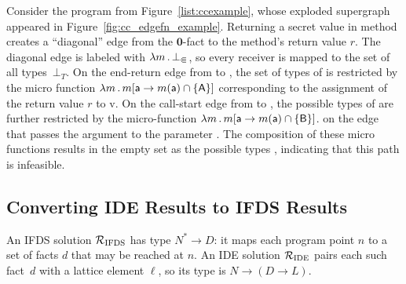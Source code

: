 \begin{example}
  Consider the program from Figure~\ref{list:ccexample}, whose exploded supergraph appeared in Figure~\ref{fig:cc_edgefn_example}.
%
  Returning a secret value in method  creates a ``diagonal'' edge from the $\mathbf0$-fact to the method's return value $r$. 
  The diagonal edge is labeled with $\lambda m\,.\,\bot_\Subset$, so every receiver is mapped to the set of all types~$\bot_T$.
%  
On the end-return edge from  to , the set of types of  is restricted by the micro function $\lambda m\,.\,m[\textsf{a}\to m(\textsf{a})\cap\{\textsf{A}\}]$ corresponding to the assignment of the return value $r$ to \code v.
%
On the call-start edge from  to , the possible types
of  are further restricted by the micro-function
$\lambda m\,.\,m[\textsf{a}\to m(\textsf{a})\cap\{\textsf{B}\}]$.
on the edge that passes the argument  to the parameter .
The composition of these micro functions results in the empty set as the possible
types , indicating that this
path 
is 
infeasible.
\end{example}




\subsection{Converting IDE Results to IFDS Results}\label{sec:ideToIfds}

An IFDS solution $\mathcal R_{\text{IFDS}}$ has type $N^* \to D$: it maps each program point $n$
to a set of facts $d$ that may be reached at $n$.
An IDE solution $\mathcal R_{\text{IDE}}$
pairs each such fact~$d$ with a lattice element $\ell$, so its type
is $N \to (D \to L)$.

